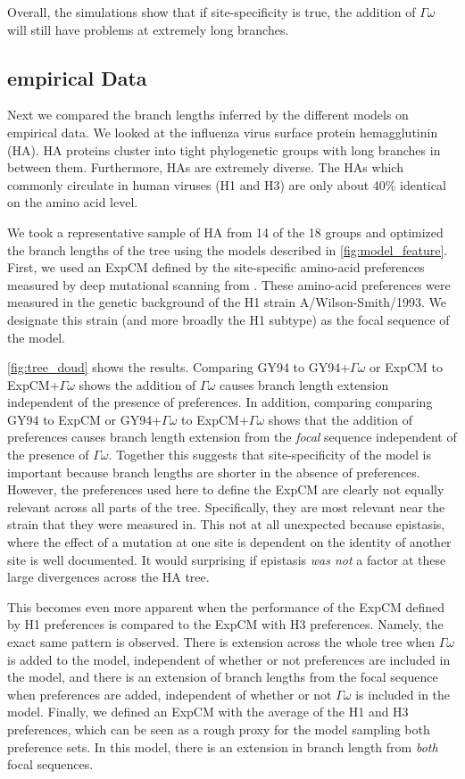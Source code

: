 \documentclass[11pt]{article}
\begin{document}
Overall, the simulations show that if site-specificity is true, the addition of $\Gamma\omega$ will still have problems at extremely long branches. 

\subsection*{empirical Data}

Next we compared the branch lengths inferred by the different models on empirical data. 
We looked at the influenza virus surface protein hemagglutinin (HA). 
HA proteins cluster into tight phylogenetic groups with long branches in between them. 
Furthermore, HAs are extremely diverse. 
The HAs which commonly circulate in human viruses (H1 and H3) are only about 40\% identical on the amino acid level. 

We took a representative sample of HA from 14 of the 18 groups and optimized the branch lengths of the tree using the models described in \ref{fig:model_feature}. 
First, we used an ExpCM defined by the site-specific amino-acid preferences measured by deep mutational scanning from \cite{doud2016accurate}. 
These amino-acid preferences were measured in the genetic background of the H1 strain A/Wilson-Smith/1993. 
We designate this strain (and more broadly the H1 subtype) as the focal sequence of the model. 

\ref{fig:tree_doud} shows the results. 
Comparing GY94 to GY94+$\Gamma\omega$ or ExpCM to ExpCM+$\Gamma\omega$ shows the addition of $\Gamma\omega$ causes branch length extension independent of the presence of preferences. 
In addition, comparing comparing GY94 to ExpCM or GY94+$\Gamma\omega$ to ExpCM+$\Gamma\omega$ shows that the addition of preferences causes branch length extension from the \textit{focal} sequence independent of the presence of $\Gamma\omega$. 
Together this suggests that site-specificity of the model is important because branch lengths are shorter in the absence of preferences. 
However, the preferences used here to define the ExpCM are clearly not equally relevant across all parts of the tree. 
Specifically, they are most relevant near the strain that they were measured in. 
This not at all unexpected because epistasis, where the effect of a mutation at one site is dependent on the identity of another site is well documented. 
It would surprising if epistasis \textit{was not} a factor at these large divergences across the HA tree. 

This becomes even more apparent when the performance of the ExpCM defined by H1 preferences is compared to the ExpCM with H3 preferences. 
Namely, the exact same pattern is observed. 
There is extension across the whole tree when $\Gamma\omega$ is added to the model, independent of whether or not preferences are included in the model, and there is an extension of branch lengths from the focal sequence when preferences are added, independent of whether or not $\Gamma\omega$ is included in the model. 
Finally, we defined an ExpCM with the average of the H1 and H3 preferences, which can be seen as a rough proxy for the model sampling both preference sets. 
In this model, there is an extension in branch length from \textit{both} focal sequences. 
\end{document}
